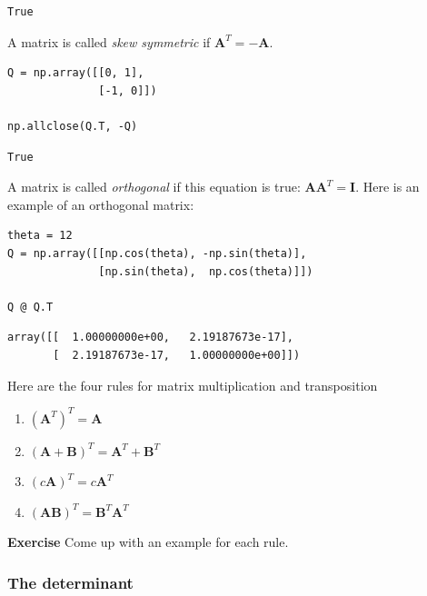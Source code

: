 \documentclass[11pt]{article}
\begin{document}
\begin{verbatim}
True
\end{verbatim}

A matrix is called \emph{skew symmetric} if \(\mathbf{A}^T = -\mathbf{A}\).

\begin{verbatim}
Q = np.array([[0, 1],
              [-1, 0]])

np.allclose(Q.T, -Q)
\end{verbatim}

\begin{verbatim}
True
\end{verbatim}



A matrix is called \emph{orthogonal} if this equation is true: \(\mathbf{A} \mathbf{A}^T = \mathbf{I}\). Here is an example of an orthogonal matrix:

\begin{verbatim}
theta = 12
Q = np.array([[np.cos(theta), -np.sin(theta)],
              [np.sin(theta),  np.cos(theta)]])

Q @ Q.T
\end{verbatim}

\begin{verbatim}
array([[  1.00000000e+00,   2.19187673e-17],
       [  2.19187673e-17,   1.00000000e+00]])
\end{verbatim}

Here are the four rules for matrix multiplication and transposition

\begin{enumerate}
\item \((\mathbf{A}^T)^T = \mathbf{A}\)

\item \((\mathbf{A}+\mathbf{B})^T = \mathbf{A}^T+\mathbf{B}^T\)

\item \((\mathit{c}\mathbf{A})^T = \mathit{c}\mathbf{A}^T\)

\item \((\mathbf{AB})^T = \mathbf{B}^T\mathbf{A}^T\)
\end{enumerate}

\textbf{Exercise} Come up with an example for each rule.

\subsubsection{The determinant}
\label{sec:orga5df3a2}
\end{document}
